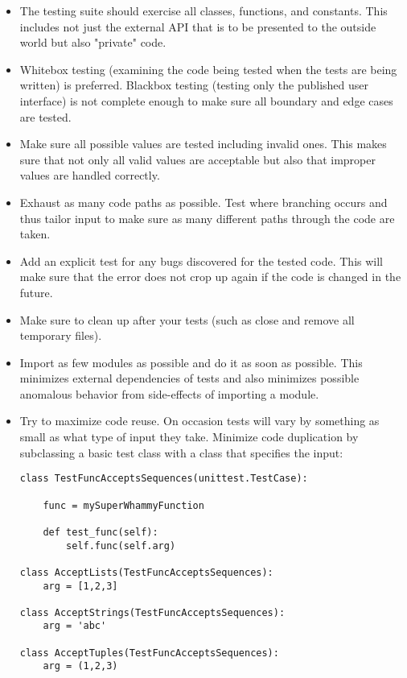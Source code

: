 \begin{itemize}
\item The testing suite should exercise all classes, functions, and
      constants.
      This includes not just the external API that is to be presented to the
      outside world but also "private" code.
\item Whitebox testing (examining the code being tested when the tests are
      being written) is preferred.
      Blackbox testing (testing only the published user interface) is not
      complete enough to make sure all boundary and edge cases are tested.
\item Make sure all possible values are tested including invalid ones.
      This makes sure that not only all valid values are acceptable but also
      that improper values are handled correctly.
\item Exhaust as many code paths as possible.
      Test where branching occurs and thus tailor input to make sure as many
      different paths through the code are taken.
\item Add an explicit test for any bugs discovered for the tested code.
      This will make sure that the error does not crop up again if the code is
      changed in the future.
\item Make sure to clean up after your tests (such as close and remove all
      temporary files).
\item Import as few modules as possible and do it as soon as possible.
      This minimizes external dependencies of tests and also minimizes possible
      anomalous behavior from side-effects of importing a module.
\item Try to maximize code reuse.
      On occasion tests will vary by something as small as what type of input
      they take.
      Minimize code duplication by subclassing a basic test class with a class
      that specifies the input:
\begin{verbatim}
class TestFuncAcceptsSequences(unittest.TestCase):

    func = mySuperWhammyFunction

    def test_func(self):
        self.func(self.arg)

class AcceptLists(TestFuncAcceptsSequences):
    arg = [1,2,3]

class AcceptStrings(TestFuncAcceptsSequences):
    arg = 'abc'

class AcceptTuples(TestFuncAcceptsSequences):
    arg = (1,2,3)
\end{verbatim}
\end{itemize}

